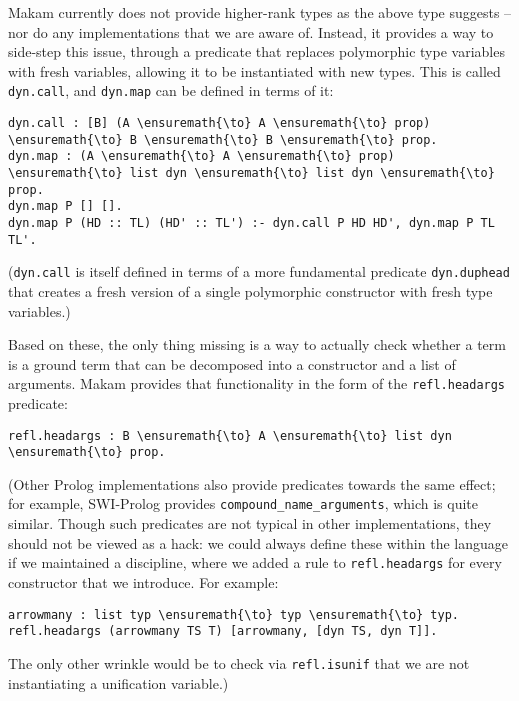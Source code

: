 Makam currently does not provide higher-rank types as the above type
suggests -- nor do any \lamprolog implementations that we are aware of.
Instead, it provides a way to side-step this issue, through a predicate
that replaces polymorphic type variables with fresh variables, allowing
it to be instantiated with new types. This is called \texttt{dyn.call},
and \texttt{dyn.map} can be defined in terms of it:

\begin{verbatim}
dyn.call : [B] (A \ensuremath{\to} A \ensuremath{\to} prop) \ensuremath{\to} B \ensuremath{\to} B \ensuremath{\to} prop.
dyn.map : (A \ensuremath{\to} A \ensuremath{\to} prop) \ensuremath{\to} list dyn \ensuremath{\to} list dyn \ensuremath{\to} prop.
dyn.map P [] [].
dyn.map P (HD :: TL) (HD' :: TL') :- dyn.call P HD HD', dyn.map P TL TL'.
\end{verbatim}

(\texttt{dyn.call} is itself defined in terms of a more fundamental
predicate \texttt{dyn.duphead} that creates a fresh version of a single
polymorphic constructor with fresh type variables.)

Based on these, the only thing missing is a way to actually check
whether a term is a ground term that can be decomposed into a
constructor and a list of arguments. Makam provides that functionality
in the form of the \texttt{refl.headargs} predicate:

\begin{verbatim}
refl.headargs : B \ensuremath{\to} A \ensuremath{\to} list dyn \ensuremath{\to} prop.
\end{verbatim}

(Other Prolog implementations also provide predicates towards the same
effect; for example, SWI-Prolog provides
\texttt{compound\_name\_arguments}, which is quite similar. Though such
predicates are not typical in other \lamprolog implementations, they
should not be viewed as a hack: we could always define these within the
language if we maintained a discipline, where we added a rule to
\texttt{refl.headargs} for every constructor that we introduce. For
example:

\begin{verbatim}
arrowmany : list typ \ensuremath{\to} typ \ensuremath{\to} typ.
refl.headargs (arrowmany TS T) [arrowmany, [dyn TS, dyn T]].
\end{verbatim}

The only other wrinkle would be to check via \texttt{refl.isunif} that
we are not instantiating a unification variable.)


